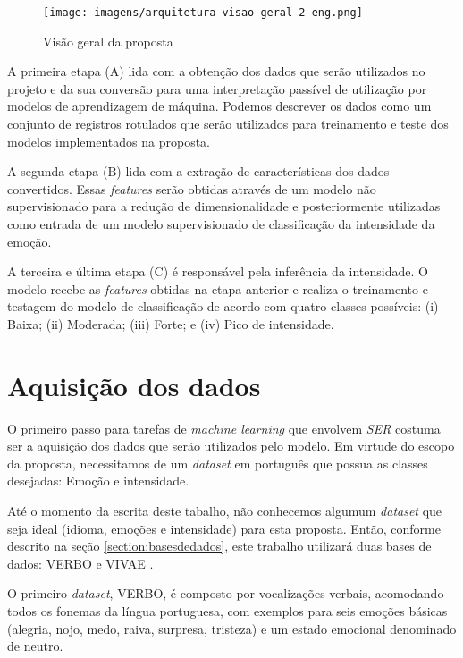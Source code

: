\begin{figure}[!h]
\centering
\texttt{[image: imagens/arquitetura-visao-geral-2-eng.png]}
\caption{\label{fig:visaogeralproposta}Visão geral da proposta}
\end{figure}

A primeira etapa (A) lida com a obtenção dos dados que serão utilizados no projeto e da sua conversão para uma interpretação passível de utilização por modelos de aprendizagem de máquina. Podemos descrever os dados como um conjunto de registros rotulados que serão utilizados para treinamento e teste dos modelos implementados na proposta.

A segunda etapa (B) lida com a extração de características dos dados convertidos. Essas \textit{features} serão obtidas através de um modelo não supervisionado para a redução de dimensionalidade e posteriormente utilizadas como entrada de um modelo supervisionado de classificação da intensidade da emoção.

A terceira e última etapa (C) é responsável pela inferência da intensidade. O modelo recebe as \textit{features} obtidas na etapa anterior e realiza o treinamento e testagem do modelo de classificação de acordo com quatro classes possíveis: (i) Baixa; (ii) Moderada; (iii) Forte; e (iv) Pico de intensidade.

\section{Aquisição dos dados}\label{sec:bravo_dados}

O primeiro passo para tarefas de \textit{machine learning} que envolvem \textit{SER} costuma ser a aquisição dos dados que serão utilizados pelo modelo. Em virtude do escopo da proposta, necessitamos de um \textit{dataset} em português que possua as classes desejadas: Emoção e intensidade.

Até o momento da escrita deste tabalho, não conhecemos algumum \textit{dataset} que seja ideal (idioma, emoções e intensidade) para esta proposta. Então, conforme descrito na seção \ref{section:basesdedados}, este trabalho utilizará duas bases de dados: VERBO \cite{12.21} e VIVAE \cite{16}.

O primeiro \textit{dataset}, VERBO, é composto por vocalizações verbais, acomodando todos os fonemas da língua portuguesa, com exemplos para seis emoções básicas (alegria, nojo, medo, raiva, surpresa, tristeza) e um estado emocional denominado de neutro.

